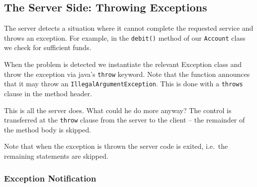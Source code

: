 

\subsection{The Server Side: Throwing Exceptions}

The server detects a situation where it cannot complete the requested service
and throws an exception. For example, in the \verb+debit()+ method of our
\verb+Account+ class we check for sufficient funds.


When the problem is detected we instantiate the relevant Exception class and
throw the exception via java's \verb+throw+ keyword. Note that the function
announces that it may throw an \verb+IllegalArgumentException+. This is done
with a \verb+throws+ clause in the method header.

This is all the server does. What could he do more anyway? The control is
transferred at the \verb+throw+ clause from the server to the client -- the
remainder of the method body is skipped.      

Note that when the exception is thrown the server code is exited, i.e.\ the 
remaining statements are skipped.


\subsubsection{Exception Notification}

